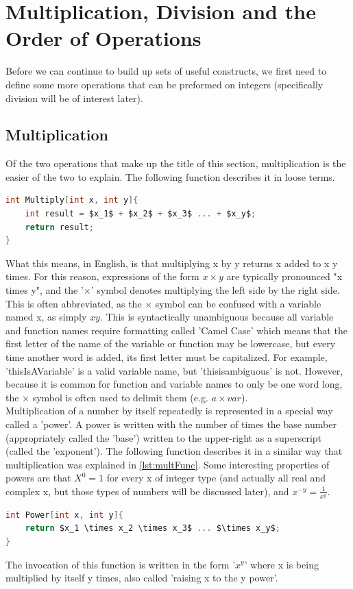 \section{Multiplication, Division and the Order of Operations}
Before we can continue to build up sets of useful constructs, we first need to define some more operations that can be preformed on integers (specifically division will be of interest later). \\

\subsection{Multiplication}
Of the two operations that make up the title of this section, multiplication is the easier of the two to explain. The following function describes it in loose terms.
\begin{center}
\begin{lstlisting}[language=C,caption=Multiplication Function,label=lst:multFunc,mathescape]
int Multiply[int x, int y]{
	int result = $x_1$ + $x_2$ + $x_3$ ... + $x_y$;
	return result;
}
\end{lstlisting}
\end{center}

What this means, in English, is that multiplying x by y returns x added to x y times. For this reason, expressions of the form $x\times y$ are typically pronounced "x times y", and the '$\times$' symbol denotes multiplying the left side by the right side. This is often abbreviated, as the $\times$ symbol can be confused with a variable named x, as simply $xy$. This is syntactically unambiguous because all variable and function names require formatting called 'Camel Case' which means that the first letter of the name of the variable or function may be lowercase, but every time another word is added, its first letter must be capitalized. For example, 'thisIsAVariable' is a valid variable name, but 'thisisambiguous' is not. However, because it is common for function and variable names to only be one word long, the $\times$ symbol is often used to delimit them (e.g. $a\times var$). \\
Multiplication of a number by itself repeatedly is represented in a special way called a 'power'. A power is written with the number of times the base number (appropriately called the 'base') written to the upper-right as a superscript (called the 'exponent'). The following function describes it in a similar way that multiplication was explained in \ref{lst:multFunc}. Some interesting properties of powers are that $X^0=1$ for every x of integer type (and actually all real and complex x, but those types of numbers will be discussed later), and $x^{-y}=\frac{1}{x^y}$.
\begin{center}
\begin{lstlisting}[language=C,caption=Power Function,label=lst:powFunc,mathescape]
int Power[int x, int y]{
	return $x_1 \times x_2 \times x_3$ ... $\times x_y$;
}
\end{lstlisting}
\end{center}
The invocation of this function is written in the form '$x^y$' where x is being multiplied by itself y times, also called 'raising x to the y power'.

